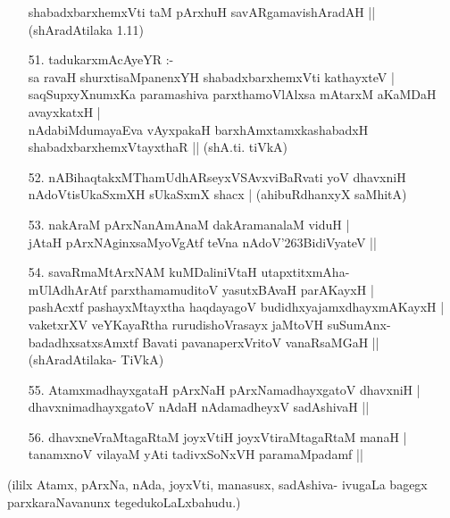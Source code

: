 \begin{itemize}
shabadxbarxhemxVti taM pArxhuH savARgamavishAradAH ||
\hfill{(shAradAtilaka 1.11)}
\item[51.] tadukarxmAcAyeYR :-\\
sa ravaH shurxtisaMpanenxYH shabadxbarxhemxVti kathayxteV |\\
saqSupxyXnumxKa paramashiva parxthamoVlAlxsa mAtarxM aKaMDaH avayxkatxH |\\
nAdabiMdumayaEva vAyxpakaH barxhAmxtamxkashabadxH shabadxbarxhemxVtayxthaR ||
\hfill{(shA.ti. tiVkA)}
\item[52.] nABihaqtakxMThamUdhARseyxVSAvxviBaRvati yoV dhavxniH \\
nAdoVtisUkaSxmXH sUkaSxmX shacx |
\hfill{(ahibuRdhanxyX saMhitA)}
\item[53.] nakAraM pArxNanAmAnaM dakAramanalaM viduH |\\
jAtaH pArxNAginxsaMyoVgAtf teVna nAdoV\char'263BidiVyateV ||
\item[54.] savaRmaMtArxNAM kuMDaliniVtaH utapxtitxmAha-\\
mUlAdhArAtf parxthamamuditoV yasutxBAvaH parAKayxH |\\
pashAcxtf pashayxMtayxtha haqdayagoV budidhxyajamxdhayxmAKayxH |\\
vaketxrXV veYKayaRtha rurudishoVrasayx jaMtoVH suSumAnx-\\
badadhxsatxsAmxtf Bavati pavanaperxVritoV vanaRsaMGaH ||
\hfill{(shAradAtilaka- TiVkA)}
\item[55.] AtamxmadhayxgataH pArxNaH pArxNamadhayxgatoV dhavxniH |\\
dhavxnimadhayxgatoV nAdaH nAdamadheyxV sadAshivaH ||
\item[56.] dhavxneVraMtagaRtaM joyxVtiH joyxVtiraMtagaRtaM manaH |\\
tanamxnoV vilayaM yAti tadivxSoNxVH paramaMpadamf ||
\end{itemize}

(ililx Atamx, pArxNa, nAda, joyxVti, manasusx, sadAshiva- ivugaLa bagegx parxkaraNavanunx tegedukoLaLxbahudu.)

